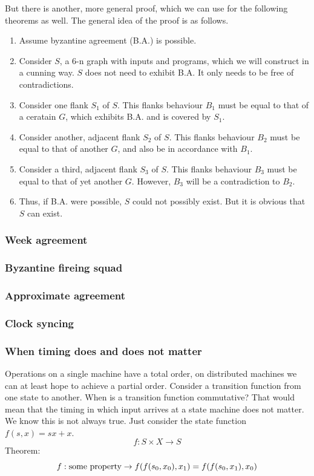 But there is another, more general proof, which we can use for the following theorems as well. The general idea of the proof is as follows. 
\begin{enumerate}
    \item Assume byzantine agreement (B.A.) is possible.
    \item Consider $S$, a 6-n graph with inputs and programs, which we will construct in a cunning way. $S$ does not need to exhibit B.A. It only needs to be free of contradictions.
    \item Consider one flank $S_1$ of $S$. This flanks behaviour $B_1$ must be equal to that of a ceratain $G$, which exhibits B.A. and is covered by $S_1$. 
    \item Consider another, adjacent flank $S_2$ of $S$. This flanks behaviour $B_2$ must be equal to that of another $G$, and also be in accordance with $B_1$. 
    \item Consider a third, adjacent flank $S_3$ of $S$. This flanks behaviour $B_3$ must be equal to that of yet another $G$. However, $B_3$ will be a contradiction to $B_2$.
    \item Thus, if B.A. were possible, $S$ could not possibly exist. But it is obvious that $S$ can exist.
\end{enumerate}


\subsubsection{Week agreement}
\subsubsection{Byzantine fireing squad}
\subsubsection{Approximate agreement}
\subsubsection{Clock syncing}


\subsubsection{When timing does and does not matter}
Operations on a single machine have a total order, on distributed machines we can at least hope to achieve a partial order.
Consider a transition function from one state to another. When is a transition function commutative? That would mean that the timing in which input arrives at a state machine does not matter. We know this is not always true. Just consider the state function $f(s, x) = sx + x$. 
$$ f : S \times X \to S$$
Theorem:
$$ f: \text{some property} \to f(f(s_0, x_0), x_1) = f(f(s_0, x_1), x_0)$$

